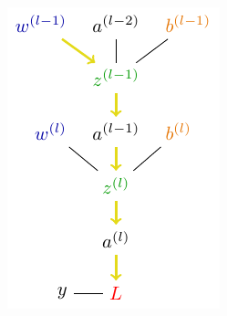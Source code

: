 \begin{minipage}{0.45\textwidth}
\includegraphics[width=\textwidth]{tikz/chapter3 - Chain Rule Multiple Layer Dependencies.pdf}
\end{minipage}

